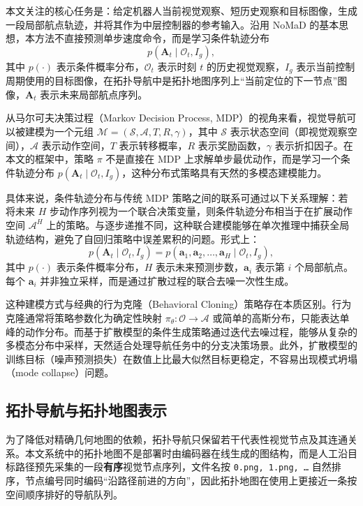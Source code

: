 本文关注的核心任务是：给定机器人当前视觉观察、短历史观察和目标图像，生成一段局部航点轨迹，并将其作为中层控制器的参考输入。沿用 NoMaD 的基本思想\cite{nomad2023}，本方法不直接预测单步速度命令，而是学习条件轨迹分布
\begin{equation}
p(\mathbf{A}_t \mid \mathcal{O}_t, I_g),
\end{equation}
其中 $p(\cdot)$ 表示条件概率分布，$\mathcal{O}_t$ 表示时刻 $t$ 的历史视觉观察，$I_g$ 表示当前控制周期使用的目标图像，在拓扑导航中是拓扑地图序列上``当前定位的下一节点''图像，$\mathbf{A}_t$ 表示未来局部航点序列。

从马尔可夫决策过程（Markov Decision Process, MDP）的视角来看，视觉导航可以被建模为一个元组 $\mathcal{M} = (\mathcal{S}, \mathcal{A}, T, R, \gamma)$，其中 $\mathcal{S}$ 表示状态空间（即视觉观察空间），$\mathcal{A}$ 表示动作空间，$T$ 表示转移概率，$R$ 表示奖励函数，$\gamma$ 表示折扣因子。在本文的框架中，策略 $\pi$ 不是直接在 MDP 上求解单步最优动作，而是学习一个条件轨迹分布 $p(\mathbf{A}_t \mid \mathcal{O}_t, I_g)$，这种分布式策略具有天然的多模态建模能力。

具体来说，条件轨迹分布与传统 MDP 策略之间的联系可通过以下关系理解：若将未来 $H$ 步动作序列视为一个联合决策变量，则条件轨迹分布相当于在扩展动作空间 $\mathcal{A}^H$ 上的策略。与逐步递推不同，这种联合建模能够在单次推理中捕获全局轨迹结构，避免了自回归策略中误差累积的问题。形式上：
\begin{equation}
p(\mathbf{A}_t \mid \mathcal{O}_t, I_g) = p(\mathbf{a}_1, \mathbf{a}_2, \ldots, \mathbf{a}_H \mid \mathcal{O}_t, I_g),
\end{equation}
其中 $p(\cdot)$ 表示条件概率分布，$H$ 表示未来预测步数，$\mathbf{a}_i$ 表示第 $i$ 个局部航点。每个 $\mathbf{a}_i$ 并非独立采样，而是通过扩散过程的联合去噪一次性生成。

这种建模方式与经典的行为克隆（Behavioral Cloning）策略存在本质区别。行为克隆通常将策略参数化为确定性映射 $\pi_\theta: \mathcal{O} \to \mathcal{A}$ 或简单的高斯分布，只能表达单峰的动作分布。而基于扩散模型的条件生成策略通过迭代去噪过程，能够从复杂的多模态分布中采样，天然适合处理导航任务中的分支决策场景。此外，扩散模型的训练目标（噪声预测损失）在数值上比最大似然目标更稳定，不容易出现模式坍塌（mode collapse）问题。

\subsection{拓扑导航与拓扑地图表示}

为了降低对精确几何地图的依赖，拓扑导航只保留若干代表性视觉节点及其连通关系\cite{savinov2018sptm,chaplot2020nts,shah2021ving}。本文系统中的拓扑地图不是部署时由编码器在线生成的图结构，而是人工沿目标路径预先采集的一段\textbf{有序}视觉节点序列，文件名按 \texttt{0.png, 1.png, \ldots} 自然排序，节点编号同时编码``沿路径前进的方向''，因此拓扑地图在使用上更接近一条按空间顺序排好的导航队列。

